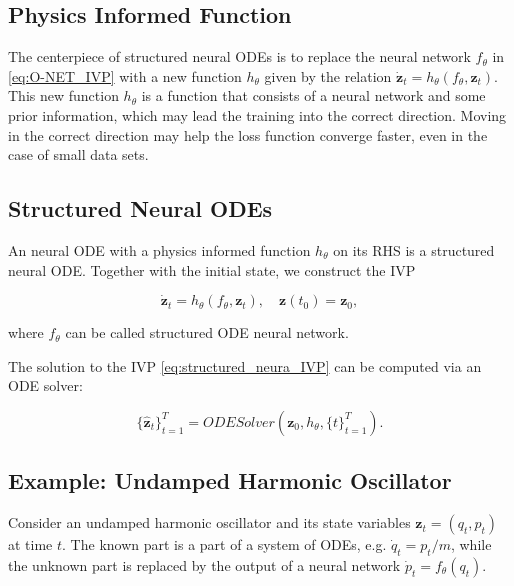 \documentclass[
	parskip, 			   %
	twoside, 			   %
	DIV=14, 			   %
	BCOR=15.0mm, 		   %
	headsepline, 		   %
	open=right, 		   %
	captions=tableheading, %
	bibliography=totoc,    %
	numbers=noenddot       %
]{scrreprt}
\begin{document}
\subsection{Physics Informed Function}

The centerpiece of structured neural ODEs is to replace the neural network $f_{\theta}$ in \ref{eq:O-NET_IVP} with a new function $h_{\theta}$ given by the relation $\dot{\mathbf{z}}_t = h_{\theta}(f_{\theta}, \mathbf{z}_t)$. This new function $h_{\theta}$ is a function that consists of a neural network and some prior information, which may lead the training into the correct direction. Moving in the correct direction may help the loss function converge faster, even in the case of small data sets.

\subsection{Structured Neural ODEs}

An neural ODE with a physics informed function $h_{\theta}$ on its RHS is a structured neural ODE. Together with the initial state, we construct the IVP

\begin{equation}
    \label{eq:structured_neura_IVP}
    \dot{\mathbf{z}}_t = h_{\theta}(f_{\theta}, \mathbf{z}_t), \quad \mathbf{z}(t_{0}) = \mathbf{z}_{0},
\end{equation}

where $f_{\theta}$ can be called structured ODE neural network.

The solution to the IVP \ref{eq:structured_neura_IVP} can be computed via an ODE solver:

\begin{equation}
    \label{eq:structured_O-NET_ODESolver}
        \{ \mathbf{\hat{z}}_{t} \}_{t=1}^{T} = ODESolver(\mathbf{z}_{0}, h_{\theta}, \{ t \}_{t=1}^{T}).
\end{equation}

\subsection{Example: Undamped Harmonic Oscillator}

Consider an undamped harmonic oscillator and its state variables $\mathbf{z}_t=(q_t, p_t)$ at time $t$. The known part is a part of a system of ODEs, e.g. $\dot{q}_t = p_t/m$, while the unknown part is replaced by the output of a neural network $\dot{p}_t = f_{\theta}(q_t)$. 
\end{document}
